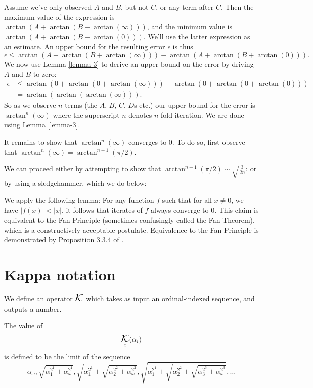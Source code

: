 \documentclass[
]{article}
\DeclareMathOperator*{\kap}{\text{\Large{$\mathcal K$}}}
\theoremstyle{theorem}
\theoremstyle{lemma}
\theoremstyle{corollary}
\theoremstyle{remark}
\theoremstyle{definition}
\begin{document}
Assume we've only observed \(A\) and \(B\), but not \(C\), or any term after \(C\). Then the maximum value of the expression is \(\arctan(A + \arctan(B + \arctan(\infty)))\), and the minimum value is \(\arctan(A + \arctan(B + \arctan(0)))\). We'll use the latter expression as an estimate. An upper bound for the resulting error \(\epsilon\) is thus \[\epsilon \leq \arctan(A + \arctan(B + \arctan(\infty))) - \arctan(A + \arctan(B + \arctan(0))).\] We now use Lemma \ref{lemma-3} to derive an upper bound on the error by driving \(A\) and \(B\) to zero: \[\begin{aligned}\epsilon &\leq \arctan(0 + \arctan(0 + \arctan(\infty))) - \arctan(0 + \arctan(0 + \arctan(0)))\\
&= \arctan(\arctan(\arctan(\infty))).
\end{aligned}\] So as we observe \(n\) terms (the \(A\), \(B\), \(C\), \(D\)s etc.) our upper bound for the error is \(\arctan^n(\infty)\) where the superscript \(n\) denotes \(n\)-fold iteration. We are done using Lemma \ref{lemma-3}.

It remains to show that \(\arctan^n(\infty)\) converges to \(0\). To do so, first observe that \(\arctan^n(\infty) = \arctan^{n-1}(\pi/2)\).

We can proceed either by attempting to show that \(\arctan^{n-1}(\pi/2) \sim \sqrt{\frac{3}{2n}}\); or by using a sledgehammer, which we do below:

We apply the following lemma: For any function \(f\) such that for all \(x \neq 0\), we have \(|f(x)| < |x|\), it follows that iterates of \(f\) always converge to \(0\). This claim is equivalent to the Fan Principle (sometimes confusingly called the Fan Theorem), which is a constructively acceptable postulate. Equivalence to the Fan Principle is demonstrated by Proposition 3.3.4 of \cite{diener2018constructive}.

\hypertarget{kappa-notation}{%
\section{Kappa notation}\label{kappa-notation}}

We define an operator \(\kap\) which takes as input an ordinal-indexed sequence, and outputs a number.

The value of \[\kap_i(\alpha_i)\] is defined to be the limit of the sequence \[\alpha_\omega, \sqrt{\alpha_1^{2^1} + \alpha_\omega^{2^1}}, \sqrt{\alpha_1^{2^1} + \sqrt{\alpha_2^{2^2} + \alpha_\omega^{2^2}}}, \sqrt{\alpha_1^{2^1} + \sqrt{\alpha_2^{2^2} + \sqrt{\alpha_3^{2^3} + \alpha_\omega^{2^3}}}}, \dotsc\]
\end{document}
